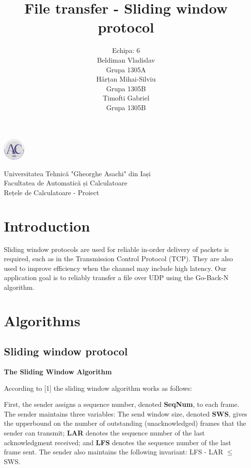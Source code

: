 \documentclass[12pt]{article}
\title{\textbf{File transfer - Sliding window protocol}}
\author{
 	Echipa: 6
	\\
	Beldiman Vladislav \\ Grupa 1305A
	\\
	Hârțan Mihai-Silviu \\ Grupa 1305B
	\\
	Timofti Gabriel \\ Grupa 1305B
}
\begin{document}
\noindent\begin{minipage}{0.1\textwidth}
	\includegraphics[width=1.1cm]{logo_AC.png}
\end{minipage}
\hfill
\begin{minipage}{1\textwidth}\raggedright
	Universitatea Tehnică "Gheorghe Asachi" din Iași\\
	Facultatea de Automatică și Calculatoare\\
	Rețele de Calculatoare - Proiect
\end{minipage}

\vspace{5cm}
{\let\newpage\relax\maketitle}
\newpage

\tableofcontents
\newpage

\section{Introduction}

Sliding window protocols are used for reliable in-order delivery of packets is required, such as in the Transmission Control Protocol (TCP). They are also used to improve efficiency when the channel may include high latency. Our application goal is to reliably transfer a file over UDP using the Go-Back-N algorithm.

\section{Algorithms}

\subsection{Sliding window protocol}

\bigskip
\textbf{The Sliding Window Algorithm}
\bigskip

According to [1] the sliding window algorithm works as follows:

First, the sender assigns a sequence number, denoted \textbf{SeqNum}, to each frame. The sender maintains three variables: The send window size, denoted \textbf{SWS}, gives the upperbound on the number of outstanding (unacknowledged) frames that the sender can transmit; \textbf{LAR} denotes the sequence number of the last acknowledgment received; and \textbf{LFS} denotes the sequence number of the last frame sent. The sender also maintains the following invariant: LFS - LAR $\leq$ SWS.
\end{document}
